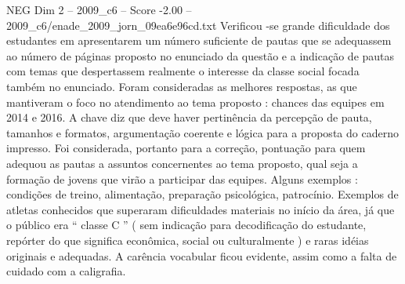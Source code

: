 \begin{textsample}{NEG Dim 2 – 2009\_c6 – Score -2.00 – 2009\_c6/enade\_2009\_jorn\_09ea6e96cd.txt}
Verificou -se grande dificuldade dos estudantes em apresentarem um número suficiente de pautas que se adequassem ao número de páginas proposto no enunciado da questão e a indicação de pautas com temas que despertassem realmente o interesse da classe social focada também no enunciado.
Foram consideradas as melhores respostas, as que mantiveram o foco no atendimento ao tema proposto : chances das equipes em 2014 e 2016.
A chave diz que deve haver pertinência da percepção de pauta, tamanhos e formatos, argumentação coerente e lógica para a proposta do caderno impresso.
Foi considerada, portanto para a correção, pontuação para quem adequou as pautas a assuntos concernentes ao tema proposto, qual seja a formação de jovens que virão a participar das equipes.
Alguns exemplos : condições de treino, alimentação, preparação psicológica, patrocínio.
Exemplos de atletas conhecidos que superaram dificuldades materiais no início da área, já que o público era “ classe C ” ( sem indicação para decodificação do estudante, repórter do que significa econômica, social ou culturalmente ) e raras idéias originais e adequadas.
A carência vocabular ficou evidente, assim como a falta de cuidado com a caligrafia.

\end{textsample}
